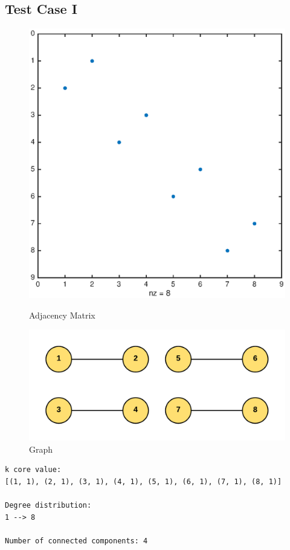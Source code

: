 \subsection{Test Case I}

\begin{figure}[H]
  \includegraphics[width=\linewidth]{spy1.eps}
  \caption{Adjacency Matrix}
\endminipage\hfill
{}
  \includegraphics[width=\linewidth]{graph1}
  \caption{Graph}
\endminipage
\end{figure}
\begin{verbatim}
k core value:
[(1, 1), (2, 1), (3, 1), (4, 1), (5, 1), (6, 1), (7, 1), (8, 1)]

Degree distribution:
1 --> 8

Number of connected components: 4
\end{verbatim}

